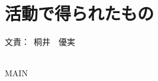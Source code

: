 \documentclass[a4paper]{jarticle}
\newcommand{\resp}[1]{\begin{flushright}文責：~#1\end{flushright}~\\}
\begin{document}
\fi

\section{活動で得られたもの}
  \resp{桐井　優実}


\expandafter\ifx\csname MAIN \endcsname\relax
  
\end{document}
